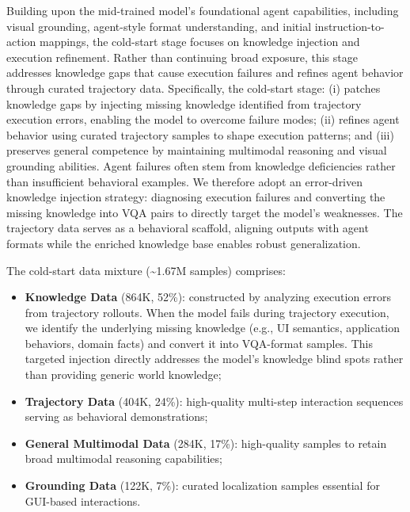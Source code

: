 Building upon the mid-trained model's foundational agent capabilities, including visual grounding, agent-style format understanding, and initial instruction-to-action mappings, the cold-start stage focuses on knowledge injection and execution refinement. Rather than continuing broad exposure, this stage addresses knowledge gaps that cause execution failures and refines agent behavior through curated trajectory data. Specifically, the cold-start stage: (i) patches knowledge gaps by injecting missing knowledge identified from trajectory execution errors, enabling the model to overcome failure modes; (ii) refines agent behavior using curated trajectory samples to shape execution patterns; and (iii) preserves general competence by maintaining multimodal reasoning and visual grounding abilities. Agent failures often stem from knowledge deficiencies rather than insufficient behavioral examples. We therefore adopt an error-driven knowledge injection strategy: diagnosing execution failures and converting the missing knowledge into VQA pairs to directly target the model's weaknesses. The trajectory data serves as a behavioral scaffold, aligning outputs with agent formats while the enriched knowledge base enables robust generalization.

The cold-start data mixture (\textasciitilde1.67M samples) comprises:
\begin{itemize}
    \item \textbf{Knowledge Data} (864K, 52\%): 
          constructed by analyzing execution errors from trajectory rollouts. 
          When the model fails during trajectory execution, we identify the underlying missing knowledge (e.g., UI semantics, application behaviors, domain facts) and convert it into VQA-format samples. 
          This targeted injection directly addresses the model's knowledge blind spots rather than providing generic world knowledge;
    \item \textbf{Trajectory Data} (404K, 24\%): 
          high-quality multi-step interaction sequences serving as behavioral demonstrations;
    \item \textbf{General Multimodal Data} (284K, 17\%): 
          high-quality samples to retain broad multimodal reasoning capabilities;
    \item \textbf{Grounding Data} (122K, 7\%): 
          curated localization samples essential for GUI-based interactions.
\end{itemize}

